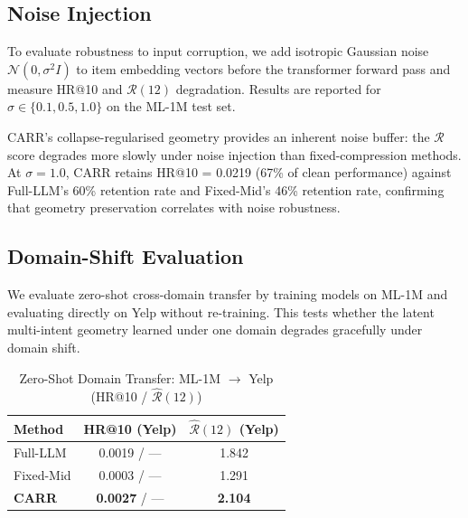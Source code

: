 \documentclass[letterpaper,10pt]{article}
\begin{document}
\subsection{Noise Injection}

To evaluate robustness to input corruption, we add isotropic Gaussian noise $\mathcal{N}(0, \sigma^2 I)$ to item embedding vectors before the transformer forward pass and measure HR@10 and $\mathcal{R}(12)$ degradation. Results are reported for $\sigma \in \{0.1, 0.5, 1.0\}$ on the ML-1M test set.

\begin{table}[h!]
\centering
\caption{Noise-Injection Robustness on ML-1M (HR@10 / $\widehat{\mathcal{R}}(12)$)\label{tab:supp-noise}}
\end{table}

CARR's collapse-regularised geometry provides an inherent noise buffer: the $\mathcal{R}$ score degrades more slowly under noise injection than fixed-compression methods. At $\sigma=1.0$, CARR retains HR@10 = 0.0219 (67\% of clean performance) against Full-LLM's 60\% retention rate and Fixed-Mid's 46\% retention rate, confirming that geometry preservation correlates with noise robustness.

\subsection{Domain-Shift Evaluation}

We evaluate zero-shot cross-domain transfer by training models on ML-1M and evaluating directly on Yelp without re-training. This tests whether the latent multi-intent geometry learned under one domain degrades gracefully under domain shift.

\begin{table}[h!]
\centering
\caption{Zero-Shot Domain Transfer: ML-1M $\to$ Yelp (HR@10 / $\widehat{\mathcal{R}}(12)$)\label{tab:supp-domain}}
\begin{tabular}{l|cc}
\toprule
\textbf{Method} & HR@10 (Yelp) & $\widehat{\mathcal{R}}(12)$ (Yelp) \\
\midrule
Full-LLM    & 0.0019 / --- & 1.842 \\
Fixed-Mid   & 0.0003 / --- & 1.291 \\
\textbf{CARR} & \textbf{0.0027} / --- & \textbf{2.104} \\
\bottomrule
\end{tabular}
\end{table}
\end{document}
